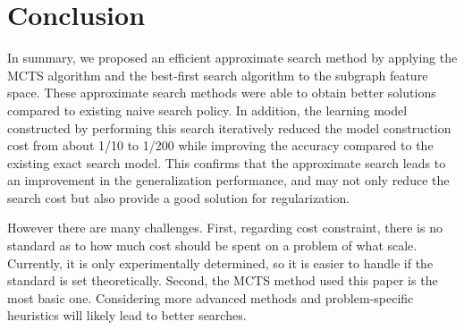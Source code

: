 \section{Conclusion}
In summary, we proposed an efficient approximate search method 
by applying the MCTS algorithm and the best-first search algorithm to the subgraph feature space.
These approximate search methods were able to obtain better solutions compared 
to existing naive search policy.
In addition, the learning model constructed by performing this search iteratively 
reduced the model construction cost from about 1/10 to 1/200 
while improving the accuracy compared to the existing exact search model.
This confirms that the approximate search leads to an improvement in the generalization performance, 
and may not only reduce the search cost but also provide a good solution for regularization.

However there are many challenges.
First, regarding cost constraint, 
there is no standard as to how much cost should be spent on a problem of what scale.
Currently, it is only experimentally determined, 
so it is easier to handle if the standard is set theoretically.
Second, the MCTS method used this paper is the most basic one. 
Considering more advanced methods and problem-specific heuristics will likely lead to better searches.

\begin{comment}
In summary, we proposed a novel efficient algorithm to learn the nonlinear model 
using subgraph indicators without any class constraint.
In addition to solving computational cost problems, 
our algorithm using MCTS improves generalization ability compared to previous methods.
The search efficiency and prediction accuracy were empirically evaluated by experiments using real datasets.

On the other hand, it is still necessary to investigate the proposed method. 
In this paper, we set the number of Monte Carlo simulations empirically, and there is no uniform standard.
Some MCTS methods may provide theoretical guarantees for searching.
Furthermore, the performance may be improved by adopting some advanced methods of MCTS 
and domain specific heuristics.
\end{comment}
